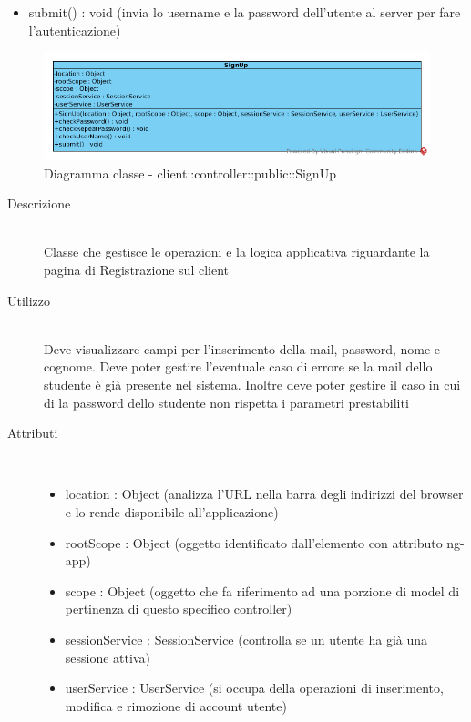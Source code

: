 \begin{description}
\begin{itemize}
\item submit() : void (invia lo username e la password dell'utente al server per fare l'autenticazione)
\end{itemize}

\end{description}

\vspace{0.5cm}
\hypertarget{client::controller::public::SignUp}{}
\begin{center}
			\begin{figure}[H]
				\centering \includegraphics[scale=4, max width=\textwidth, max height=\myheight]{../img/diagrammiClassi/client/controller/public/SignUp.png}
				\caption{Diagramma classe - client::controller::public::SignUp}
			\end{figure}
		\end{center}\begin{description}
\item[Descrizione] \hfill \\
 Classe che gestisce le operazioni e la logica applicativa riguardante la pagina di Registrazione sul client
\item[Utilizzo] \hfill \\
 Deve visualizzare campi per l’inserimento della mail, password, nome e cognome. Deve poter gestire l'eventuale caso di errore se la mail dello studente è già presente nel sistema. Inoltre deve poter gestire il caso in cui di la password dello studente non rispetta i parametri prestabiliti 
\item[Attributi] \hfill \\
 \vspace{-7mm}
\begin{itemize}
\item location : Object (analizza l'URL nella barra degli indirizzi del browser e lo rende disponibile all'applicazione)
\item rootScope : Object (oggetto identificato dall’elemento con attributo ng-app)
\item scope : Object (oggetto che fa riferimento ad una porzione di model di pertinenza di questo specifico controller)
\item sessionService : SessionService (controlla se un utente ha già una sessione attiva)
\item userService : UserService (si occupa della operazioni di inserimento, modifica e rimozione di account utente)
\end{itemize}


\end{description}
